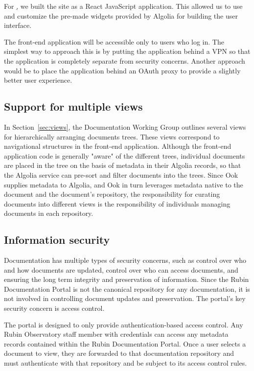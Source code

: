 For \href{www.lsst.io}, we built the site as a React JavaScript application.
This allowed us to use and customize the pre-made widgets provided by Algolia for building the user interface.

The front-end application will be accessible only to users who log in.
The simplest way to approach this is by putting the application behind a VPN so that the application is completely separate from security concerns.
Another approach would be to place the application behind an OAuth proxy to provide a slightly better user experience.

\subsection{Support for multiple views}

In Section~\ref{sec:views}, the Documentation Working Group outlines several views for hierarchically arranging documents trees.
These views correspond to navigational structures in the front-end application.
Although the front-end application code is generally "aware" of the different trees, individual documents are placed in the tree on the basis of metadata in their Algolia records, so that the Algolia service can pre-sort and filter documents into the trees.
Since Ook supplies metadata to Algolia, and Ook in turn leverages metadata native to the document and the document's repository, the responsibility for curating documents into different views is the responsibility of individuals managing documents in each repository.

\subsection{Information security}

Documentation has multiple types of security concerns, such as control over who and how documents are updated, control over who can access documents, and ensuring the long term integrity and preservation of information.
Since the Rubin Documentation Portal is not the canonical repository for any documentation, it is not involved in controlling document updates and preservation.
The portal's key security concern is access control.

The portal is designed to only provide authentication-based access control.
Any Rubin Observatory staff member with credentials can access any metadata records contained within the Rubin Documentation Portal.
Once a user selects a document to view, they are forwarded to that documentation repository and must authenticate with that repository and be subject to its access control rules.

